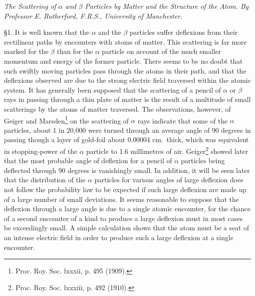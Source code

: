 \documentclass[12pt]{article}
\begin{document}
{\it The Scattering of $\alpha$ and $\beta$ Particles by Matter and the Structure of the Atom.
By Professor E. Rutherford, F.R.S.,
University of Manchester.}

\bigskip
\S 1. It is well known that the $\alpha$ and the $\beta$ particles suffer
deflexions from their rectilinear paths by encounters with atoms of matter.
This scattering is far more marked for the $\beta$ than for the $\alpha$
particle on account of the much smaller momentum and energy of the former
particle. There seems to be no doubt that such swiftly moving particles pass
through the atoms in their path, and that the deflexions observed are due to
the strong electric field traversed within the atomic system.
It has generally been supposed that the scattering of a pencil of $\alpha$
or $\beta$ rays in passing through a thin plate of matter is the result of a
multitude of small scatterings by the atoms of matter traversed.
The observations, however, of Geiger and Marsden\footnote{Proc. Roy. Soc. lxxxii, p. 495 (1909).}
on the scattering of
$\alpha$ rays indicate that some of the $\alpha$ particles,
about 1 in 20,000 were turned through an average angle of 90 degrees in
passing though a layer of gold-foil about 0.00004 cm.~thick,
which was equivalent in stopping-power of the $\alpha$ particle to
1.6 millimetres of air.
Geiger\footnote{Proc. Roy. Soc. lxxxiii, p. 492 (1910).}
showed later that the most probable angle of deflexion for a
pencil of $\alpha$ particles being deflected through 90 degrees is
vanishingly small.
In addition, it will be seen later that the distribution of the $\alpha$
particles for various angles of large deflexion does not follow the
probability law to be expected if such large deflexion are made up of a
large number of small deviations.
It seems reasonable to suppose that the deflexion through a large angle is
due to a single atomic encounter, for the chance of a second encounter of a
kind to produce a large deflexion must in most cases be exceedingly small.
A simple calculation shows that the atom must be a seat of an intense electric
field in order to produce such a large deflexion at a single encounter.
\end{document}
